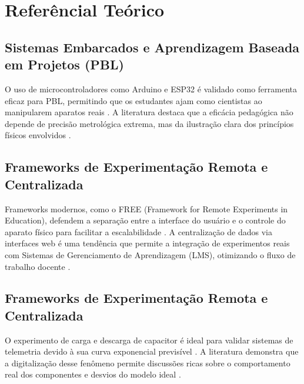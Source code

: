 \chapter[Referêncial Teórico]{Referêncial Teórico}
\label{cap_exemplos}

\section{Sistemas Embarcados e Aprendizagem Baseada em Projetos (PBL)}
O uso de microcontroladores como Arduino e ESP32 é validado como ferramenta eficaz para PBL, permitindo que os estudantes ajam como cientistas ao manipularem aparatos reais \cite{Lisboa_2021,9829840}. A literatura destaca que a eficácia pedagógica não depende de precisão metrológica extrema, mas da ilustração clara dos princípios físicos envolvidos \cite{Mishonov_2018,9829840}.

\section{Frameworks de Experimentação Remota e Centralizada}
Frameworks modernos, como o FREE (Framework for Remote Experiments in Education), defendem a separação entre a interface do usuário e o controle do aparato físico para facilitar a escalabilidade \cite{10040853}. A centralização de dados via interfaces web é uma tendência que permite a integração de experimentos reais com Sistemas de Gerenciamento de Aprendizagem (LMS), otimizando o fluxo de trabalho docente \cite{10545980,reljic}.

\section{Frameworks de Experimentação Remota e Centralizada}
O experimento de carga e descarga de capacitor é ideal para validar sistemas de telemetria devido à sua curva exponencial previsível \cite{aguilar}. A literatura demonstra que a digitalização desse fenômeno permite discussões ricas sobre o comportamento real dos componentes e desvios do modelo ideal \cite{Kowalski_2024}.
